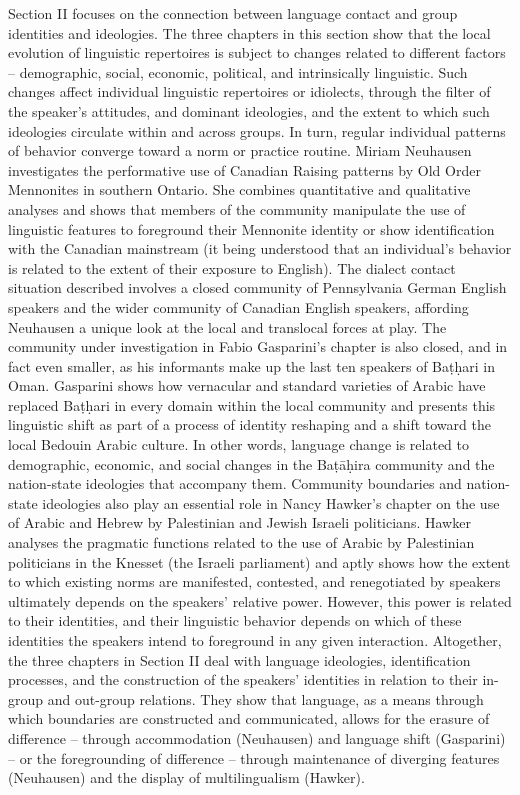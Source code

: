 \documentclass[output=paper
		  ]{langscibook}
\begin{document}
Section II focuses on the connection between language contact and group identities and ideologies. The three chapters in this section show that the local evolution of linguistic repertoires is subject to changes related to different factors – demographic, social, economic, political, and intrinsically linguistic. Such changes affect individual linguistic repertoires or idiolects, through the filter of the speaker’s attitudes, and dominant ideologies, and the extent to which such ideologies circulate within and across groups. In turn, regular individual patterns of behavior converge toward a norm or practice routine. Miriam Neuhausen investigates the performative use of Canadian Raising patterns by Old Order Mennonites in southern Ontario. She combines quantitative and qualitative analyses and shows that members of the community manipulate the use of linguistic features to foreground their Mennonite identity or show identification with the Canadian mainstream (it being understood that an individual’s behavior is related to the extent of their exposure to English). The dialect contact situation described involves a closed community of Pennsylvania German English speakers and the wider community of Canadian English speakers, affording Neuhausen a unique look at the local and translocal forces at play. The community under investigation in Fabio Gasparini’s chapter is also closed, and in fact even smaller, as his informants make up the last ten speakers of Baṭḥari in Oman. Gasparini shows how vernacular and standard varieties of Arabic have replaced Baṭḥari in every domain within the local community and presents this linguistic shift as part of a process of identity reshaping and a shift toward the local Bedouin Arabic culture. In other words, language change is related to demographic, economic, and social changes in the Baṭāḥira community and the nation-state ideologies that accompany them. Community boundaries and nation-state ideologies also play an essential role in Nancy Hawker’s chapter on the use of Arabic and Hebrew by Palestinian and Jewish Israeli politicians. Hawker analyses the pragmatic functions related to the use of Arabic by Palestinian politicians in the Knesset (the Israeli parliament) and aptly shows how the extent to which existing norms are manifested, contested, and renegotiated by speakers ultimately depends on the speakers’ relative power. However, this power is related to their identities, and their linguistic behavior depends on which of these identities the speakers intend to foreground in any given interaction. Altogether, the three chapters in Section II deal with language ideologies, identification processes, and the construction of the speakers’ identities in relation to their in-group and out-group relations. They show that language, as a means through which boundaries are constructed and communicated, allows for the erasure of difference – through accommodation (Neuhausen) and language shift (Gasparini) – or the foregrounding of difference – through maintenance of diverging features (Neuhausen) and the display of multilingualism (Hawker).
\end{document}
